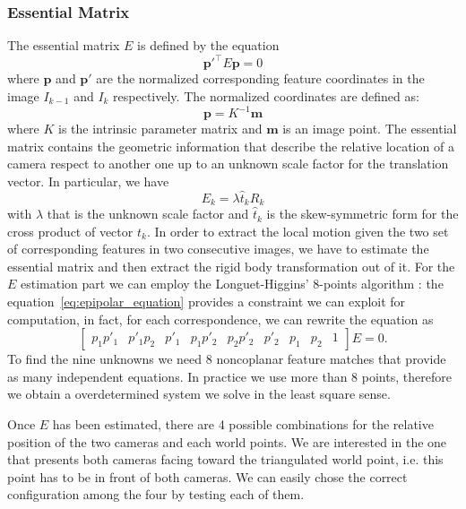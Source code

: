 \subsubsection{Essential Matrix}
\label{subsec:essential_matrix}
The essential matrix $E$ is defined by the equation
\begin{equation}
\label{eq:epipolar_equation}
\mathbf{p}'^\top E \mathbf{p} = 0
\end{equation}
\noindent where $\mathbf{p}$ and $\mathbf{p}'$ are the normalized corresponding 
feature coordinates in the image $I_{k-1}$ and $I_{k}$ respectively.
The normalized coordinates are defined as:
\begin{equation}
	\mathbf{p} = K^{-1} \mathbf{m}
\end{equation}
\noindent where $K$ is the intrinsic parameter matrix and $\mathbf{m}$ is an
image point.
The essential matrix contains the geometric information that describe the 
relative location of a camera respect to another one up to an unknown scale factor 
for the translation vector. In particular, we have
\begin{equation*}
	E_k = \lambda \hat{t}_kR_k
\end{equation*}
\noindent with $\lambda$ that is the unknown scale factor and $\hat{t}_k$ is 
the skew-symmetric form for the cross product of vector $t_k$.
In order to extract the local motion given the two set of corresponding features
in two consecutive images, we have to estimate the essential matrix and then 
extract the rigid body transformation out of it.
For the $E$ estimation part we can employ the Longuet-Higgins' 8-points 
algorithm \cite{longuet1981computer}: the equation~\ref{eq:epipolar_equation} 
provides a constraint we
can exploit for computation, in fact, for each correspondence, we can rewrite 
the equation as
\begin{equation*}
	\begin{bmatrix}
		p_1p'_1 & p'_1p_2 & p'_1 & p_1p'_2 & p_2p'_2 & p'_2 & p_1 & p_2 & 1
	\end{bmatrix}
	E = 0	\text{.}
\end{equation*}
To find the nine unknowns we need 8 noncoplanar feature matches that provide as many 
independent equations.
In practice we use more than 8 points, therefore we obtain a overdetermined 
system we solve in the least square sense.

Once $E$ has been estimated, there are 4 possible combinations for the relative 
position of the two cameras and each world points. We are interested in the one
that presents both cameras facing toward the triangulated world point,
i.e. this point has to be in front of both cameras. We can easily chose the 
correct configuration among the four by testing each of them.

